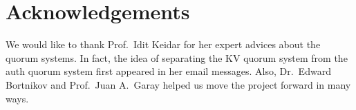 \section*{Acknowledgements}
We would like to thank Prof.~Idit Keidar for her expert advices about
the quorum systems. In fact, the idea of separating the KV quorum
system from the auth quorum system first appeared in her email
messages. Also, Dr.~Edward Bortnikov and Prof.~Juan A.~Garay helped us
move the project forward in many ways.
